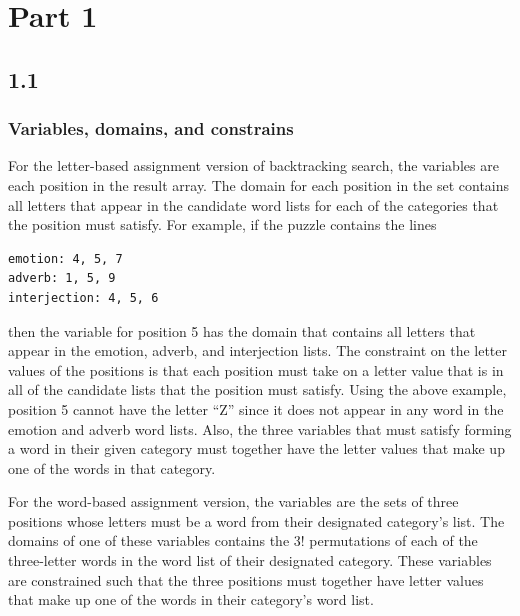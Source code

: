 \section*{Part 1}
\subsection*{1.1}
\subsubsection*{Variables, domains, and constrains}
For the letter-based assignment version of backtracking search, the variables are each position in the result array. The domain for each position in the set contains all letters that appear in the candidate word lists for each of the categories that the position must satisfy. For example, if the puzzle contains the lines
\begin{verbatim}
emotion: 4, 5, 7
adverb: 1, 5, 9
interjection: 4, 5, 6
\end{verbatim}
then the variable for position 5 has the domain that contains all letters that appear in the emotion, adverb, and interjection lists. The constraint on the letter values of the positions is that each position must take on a letter value that is in all of the candidate lists that the position must satisfy. Using the above example, position 5 cannot have the letter ``Z'' since it does not appear in any word in the emotion and adverb word lists. Also, the three variables that must satisfy forming a word in their given category must together have the letter values that make up one of the words in that category.

For the word-based assignment version, the variables are the sets of three positions whose letters must be a word from their designated category's list. The domains of one of these variables contains the 3! permutations of each of the three-letter words in the word list of their designated category. These variables are constrained such that the three positions must together have letter values that make up one of the words in their category's word list.
